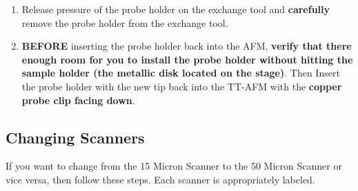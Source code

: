 \documentclass{../lab}
\begin{document}
\begin{enumerate}
    \item  Release pressure of the probe holder on the exchange tool and \textbf{carefully} remove the probe holder from the exchange tool.
    
    \item \textbf{BEFORE} inserting the probe holder back into the AFM, \textbf{verify that there enough room for you to install the probe holder without hitting the sample holder (the metallic disk located on the stage)}.  Then Insert the probe holder with the new tip back into the TT-AFM with the \textbf{copper probe clip facing down}.
    
\end{enumerate}

\subsection{Changing Scanners}
\label{subsec:ChangingScanners}

If you want to change from the 15 Micron Scanner to the 50 Micron Scanner or vice versa, then follow these steps. Each scanner is appropriately labeled.
\end{document}
